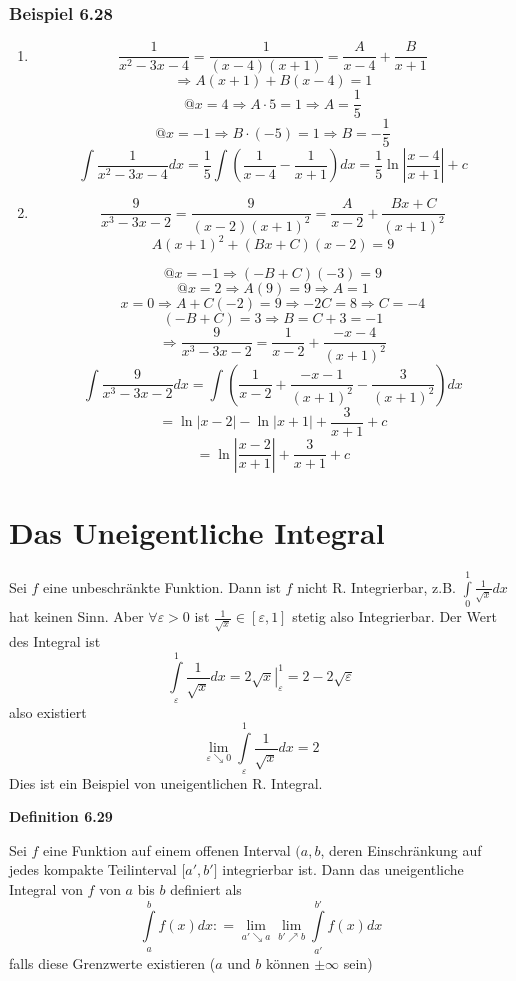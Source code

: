 \subsubsection*{Beispiel 6.28}
\begin{enumerate}
\item $$\frac{1}{x^2 -3x -4}=\frac{1}{(x-4)(x+1)}=\frac{A}{x-4}+\frac{B}{x+1}$$
$$\Rightarrow A(x+1)+B(x-4)=1$$
$$@x=4\Rightarrow A\cdot 5=1\Rightarrow A=\frac{1}{5}$$
$$@x=-1\Rightarrow B\cdot (-5)=1\Rightarrow B=-\frac{1}{5}$$
\[\int {\frac{1}{{{x^2} - 3x - 4}}dx = \frac{1}{5}\int {\left( {\frac{1}{{x - 4}} - \frac{1}{{x + 1}}} \right)dx = \frac{1}{5}} } \ln \left| {\frac{{x - 4}}{{x + 1}}} \right| + c\]
\item \[\frac{9}{{{x^3} - 3x - 2}} = \frac{9}{{(x - 2){{(x + 1)}^2}}} = \frac{A}{{x - 2}} + \frac{{Bx + C}}{{{{(x + 1)}^2}}}\]
\[A{(x + 1)^2} + (Bx + C)(x - 2) = 9\]

$$@x=-1\Rightarrow(-B+C)(-3)=9$$
$$@x=2\Rightarrow A(9)=9\Rightarrow A=1$$
$$x=0\Rightarrow A+C(-2)=9\Rightarrow -2C=8\Rightarrow C=-4$$
$$(-B+C)=3\Rightarrow B=C+3=-1$$
$$\Rightarrow \frac{9}{x^3-3x-2}=\frac{1}{x-2}+\frac{-x-4}{(x+1)^2}$$
\[\int {\frac{9}{{{x^3} - 3x - 2}}dx = \int {\left( {\frac{1}{{x - 2}} + \frac{{ - x - 1}}{{{{(x + 1)}^2}}} - \frac{3}{{{{(x + 1)}^2}}}} \right)dx} } \]
\[ = \ln \left| {x - 2} \right| - \ln \left| {x + 1} \right| + \frac{3}{{x + 1}} + c\]
\[ = \ln \left| {\frac{{x - 2}}{{x + 1}}} \right| + \frac{3}{{x + 1}} + c\]
\end{enumerate}
\section{Das Uneigentliche Integral}
Sei $f$ eine unbeschränkte Funktion. Dann ist $f$ nicht R. Integrierbar, z.B. $\int\limits_0^1 {\frac{1}{{\sqrt x }}} dx$ hat keinen Sinn. Aber $\forall\varepsilon>0$ ist $\frac{1}{\sqrt{x}}\in\left[\varepsilon,1 \right]$ stetig also Integrierbar. Der Wert des Integral ist \[\int\limits_\varepsilon ^1 {\frac{1}{{\sqrt x }}} dx = \left. {2\sqrt x } \right|_\varepsilon ^1 = 2 - 2\sqrt \varepsilon  \] also existiert \[\mathop {\lim }\limits_{\varepsilon  \searrow 0} \int\limits_\varepsilon ^1 {\frac{1}{{\sqrt x }}} dx = 2\] Dies ist ein Beispiel von uneigentlichen R. Integral.

\begin{framed}
\centerline{\textbf{Definition 6.29}}
\noindent Sei $f$ eine Funktion auf einem offenen Interval $(a,b$, deren Einschränkung auf jedes kompakte Teilinterval $\lbrack a',b'\rbrack$ integrierbar ist. Dann das uneigentliche Integral von $f$ von $a$ bis $b$ definiert als \[\int\limits_a^b {f(x)dx: = \mathop {\lim }\limits_{a' \searrow a} \mathop {\lim }\limits_{b' \nearrow b} } \int\limits_{a'}^{b'} {f(x)dx} \] falls diese Grenzwerte existieren ($a$ und $b$ können $\pm \infty$ sein)
\end{framed}

